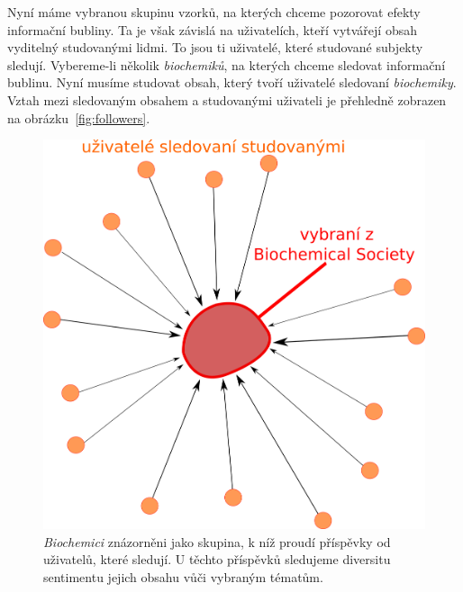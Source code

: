 \documentclass[12pt, a4paper]{article}
\numberwithin{equation}{section} 	%
\begin{document}
Nyní máme vybranou skupinu vzorků, na kterých chceme pozorovat efekty informační bubliny. Ta je však závislá na uživatelích, kteří vytvářejí obsah vyditelný studovanými lidmi. To jsou ti uživatelé, které studované subjekty sledují. Vybereme-li několik \textit{biochemiků}, na kterých chceme sledovat informační bublinu. Nyní musíme studovat obsah, který tvoří uživatelé sledovaní \textit{biochemiky}. Vztah mezi sledovaným obsahem a studovanými uživateli je přehledně zobrazen na obrázku~\autoref{fig:followers}.
\begin{figure}[h]
\centering
\includegraphics[scale=0.35]{./Pics/followers.png}
    \caption{\textit{Biochemici} znázorněni jako skupina, k níž proudí příspěvky od uživatelů, které sledují. U těchto příspěvků sledujeme diversitu sentimentu jejich obsahu vůči vybraným tématům.}
\label{fig:followers}
\end{figure}
\end{document}
